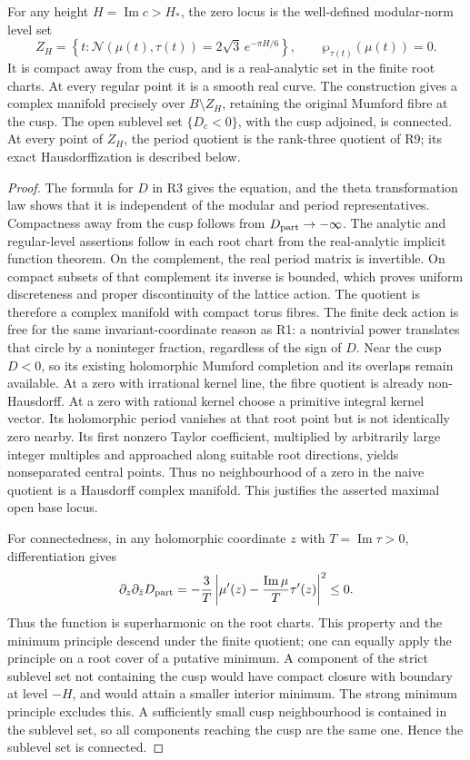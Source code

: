 \begin{proposition}\label{push:src:D.4.2}
For any height \(H=\operatorname{Im}c>H_*\), the zero locus is the
well-defined modular-norm level set
\[
 Z_H=\left\{t:\mathcal N(\mu(t),\tau(t))
                    =2\sqrt3\,e^{-\pi H/6}\right\},\qquad
 \wp_{\tau(t)}(\mu(t))=0.
\]
It is compact away from the cusp, and is a real-analytic set in the
finite root charts. At every regular point it is a smooth real curve.
The construction gives a complex manifold precisely over
\(B\setminus Z_H\), retaining the original Mumford fibre at the cusp.
The open sublevel set \(\{D_c<0\}\), with the cusp adjoined, is
connected. At every point of \(Z_H\), the period quotient is the
rank-three quotient of R9; its exact Hausdorffization is described
below.
\end{proposition}
\begin{proof}
The formula for \(D\) in R3 gives the equation, and the theta
transformation law shows that it is independent of the modular and
period representatives. Compactness away from the cusp follows from
\(D_{\rm part}\to-\infty\). The analytic and regular-level
assertions follow in each root chart from the real-analytic implicit
function theorem. On the complement, the real period matrix is
invertible. On compact subsets of that complement its inverse is
bounded, which proves uniform discreteness and proper discontinuity
of the lattice action. The quotient is therefore a complex manifold
with compact torus fibres. The finite deck action is free for the
same invariant-coordinate reason as R1: a nontrivial power translates
that circle by a noninteger fraction, regardless of the sign of
\(D\). Near the cusp \(D<0\), so its existing holomorphic Mumford
completion and its overlaps remain available.
At a zero with irrational kernel line, the fibre quotient is already
non-Hausdorff. At a zero with rational kernel choose a primitive
integral kernel vector. Its holomorphic period vanishes at that root
point but is not identically zero nearby. Its first nonzero Taylor
coefficient, multiplied by arbitrarily large integer multiples and
approached along suitable root directions, yields nonseparated
central points. Thus no neighbourhood of a zero in the naive quotient
is a Hausdorff complex manifold. This justifies the asserted maximal
open base locus.

For connectedness, in any holomorphic coordinate \(z\) with
\(T=\operatorname{Im}\tau>0\), differentiation gives
\[
 \partial_z\partial_{\bar z}D_{\rm part}
 =-\frac3T\left|\mu'(z)-
         \frac{\operatorname{Im}\mu}{T}\tau'(z)\right|^2\le0.
\]
Thus the function is superharmonic on the root charts. This property
and the minimum principle descend under the finite quotient; one
can equally apply the principle on a root cover of a putative
minimum. A component of the strict sublevel set not containing the
cusp would have compact closure with boundary at level \(-H\), and
would attain a smaller interior minimum. The strong minimum
principle excludes this. A sufficiently small cusp neighbourhood is
contained in the sublevel set, so all components reaching the cusp
are the same one. Hence the sublevel set is connected.
\end{proof}

